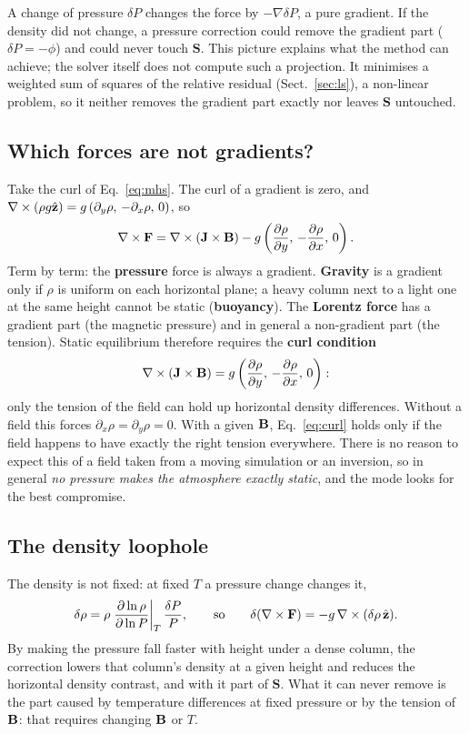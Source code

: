 A change of pressure $\delta P$ changes the force by $-\nabla\delta P$, a pure gradient. If the density did not change, a
pressure correction could remove the gradient part ($\delta P=-\phi$) and could never touch $\mathbf S$. This picture explains
what the method can achieve; the solver itself does not compute such a projection. It minimises a weighted sum of squares
of the relative residual (Sect.~\ref{sec:ls}), a non-linear problem, so it neither removes the gradient part exactly nor
leaves $\mathbf S$ untouched.

\subsection{Which forces are not gradients?}
Take the curl of Eq.~\eqref{eq:mhs}. The curl of a gradient is zero, and
$\nabla\times(\rho g\hat{\mathbf z})=g\,(\partial_y\rho,\,-\partial_x\rho,\,0)$, so
\begin{equation}
\nabla\times\mathbf F=\nabla\times(\mathbf J\times\mathbf B)-g\left(\frac{\partial\rho}{\partial y},\,-\frac{\partial\rho}{\partial x},\,0\right).
\end{equation}
Term by term: the \textbf{pressure} force is always a gradient. \textbf{Gravity} is a gradient only if $\rho$ is uniform on
each horizontal plane; a heavy column next to a light one at the same height cannot be static (\textbf{buoyancy}). The
\textbf{Lorentz force} has a gradient part (the magnetic pressure) and in general a non-gradient part (the tension). Static
equilibrium therefore requires the \textbf{curl condition}
\begin{equation}
\nabla\times(\mathbf J\times\mathbf B)=g\left(\frac{\partial\rho}{\partial y},\,-\frac{\partial\rho}{\partial x},\,0\right):
\label{eq:curl}
\end{equation}
only the tension of the field can hold up horizontal density differences. Without a field this forces
$\partial_x\rho=\partial_y\rho=0$. With a given $\mathbf B$, Eq.~\eqref{eq:curl} holds only if the field happens to have exactly the
right tension everywhere. There is no reason to expect this of a field taken from a moving simulation or an inversion, so in
general \emph{no pressure makes the atmosphere exactly static}, and the mode looks for the best compromise.

\subsection{The density loophole}
The density is not fixed: at fixed $T$ a pressure change changes it,
\begin{equation}
\delta\rho=\rho\left.\frac{\partial\ln\rho}{\partial\ln P}\right|_T\frac{\delta P}{P},
\qquad\text{so}\qquad \delta(\nabla\times\mathbf F)=-g\,\nabla\times(\delta\rho\,\hat{\mathbf z}).
\end{equation}
By making the pressure fall faster with height under a dense column, the correction lowers that column's density at a given
height and reduces the horizontal density contrast, and with it part of $\mathbf S$. What it can never remove is the part
caused by temperature differences at fixed pressure or by the tension of $\mathbf B$: that requires changing $\mathbf B$ or $T$.

